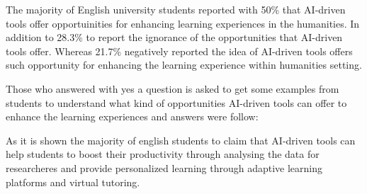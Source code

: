 \begin{figure}[h]
	\centering
\end{figure}
The majority of English university students reported with 50\% that AI-driven tools offer opportuinities
for enhancing learning experiences in the humanities. In addition to 28.3\% to report the
ignorance of the opportunities that AI-driven tools offer. Whereas 21.7\% negatively reported
the idea of AI-driven tools offers such opportunity for enhancing the learning experience
within humanities setting.


Those who answered with yes a question is asked to get some examples from students
to understand what kind of opportunities AI-driven tools can offer to enhance the learning experiences and answers were follow:


As it is shown the majority of english students to claim that AI-driven tools can
help students to boost their productivity through analysing the data for researcheres
and provide personalized learning through adaptive learning platforms and virtual tutoring.

